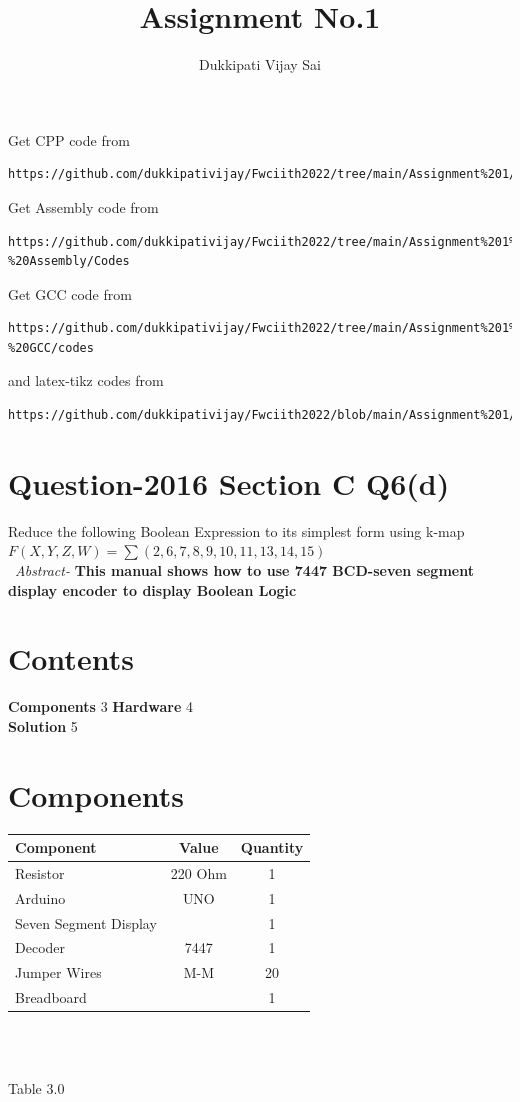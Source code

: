 \documentclass[journal,12pt,twocolumn]{IEEEtran}
\begin{document}
\title{Assignment No.1}

\author{Dukkipati Vijay Sai}
\maketitle
\newpage
\bigskip
\renewcommand{\thefigure}{\theenumi}
\renewcommand{\thetable}{\theenumi}


Get CPP code from 
\begin{lstlisting}
https://github.com/dukkipativijay/Fwciith2022/tree/main/Assignment%201/Codes/src
\end{lstlisting}
Get Assembly code from
\begin{lstlisting}
https://github.com/dukkipativijay/Fwciith2022/tree/main/Assignment%201%20-%20Assembly/Codes
\end{lstlisting}
Get GCC code from
\begin{lstlisting}
https://github.com/dukkipativijay/Fwciith2022/tree/main/Assignment%201%20-%20GCC/codes
\end{lstlisting}
%
and latex-tikz codes from 
%
\begin{lstlisting}
https://github.com/dukkipativijay/Fwciith2022/blob/main/Assignment%201/Latex%20File.tex
\end{lstlisting}
%
\section{Question-2016 Section C Q6(d)}

Reduce the following Boolean Expression to its simplest form using k-map
$F(X,Y,Z,W)= \sum(2,6,7,8,9,10,11,13,14,15)$ \\
\
\textit{Abstract-}
\textbf{This manual shows how to use 7447 BCD-seven segment display encoder to display Boolean Logic}
\section{Contents}
\raggedright
\textbf{Components}
\hspace{10em} 3
\textbf{Hardware}
\hspace{11em} 4
\\\textbf{Solution}
\hspace{11.8em}   5
\section{Components}
\centering
\begin{tabular}{|l|c|c|}
\hline
Component & Value & Quantity\\
\hline
Resistor & 220 Ohm & 1\\
\hline
Arduino & UNO & 1\\
\hline
Seven Segment Display & & 1\\
\hline
Decoder & 7447 & 1\\
\hline
Jumper Wires & M-M & 20\\
\hline
Breadboard & & 1\\
\hline
\end{tabular}\\
\
\centerline{Table 3.0}
\end{document}
